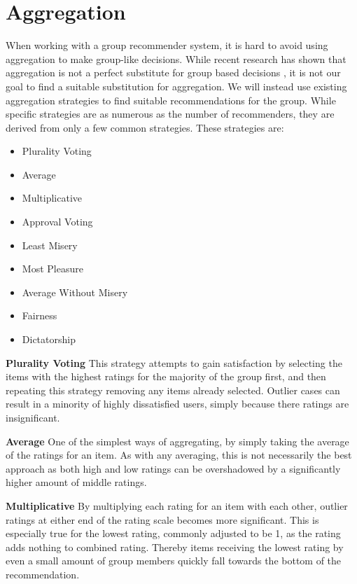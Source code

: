 \section{Aggregation} \label{bg:aggregation}
When working with a group recommender system, it is hard to avoid using aggregation to make group-like decisions. While recent research has shown that aggregation is not a perfect substitute for group based decisions , it is not our goal to find a suitable substitution for aggregation. We will instead use existing aggregation strategies to find suitable recommendations for the group. While specific strategies are as numerous as the number of recommenders, they are derived from only a few common strategies. These strategies are:

\begin{itemize}
	\item Plurality Voting
	\item Average
	\item Multiplicative
	\item Approval Voting
	\item Least Misery
	\item Most Pleasure
	\item Average Without Misery
	\item Fairness
	\item Dictatorship
\end{itemize}

\textbf{Plurality Voting}
This strategy attempts to gain satisfaction by selecting the items with the highest ratings for the majority of the group first, and then repeating this strategy removing any items already selected. Outlier cases can result in a minority of highly dissatisfied users, simply because there ratings are insignificant.

\textbf{Average}
One of the simplest ways of aggregating, by simply taking the average of the ratings for an item. As with any averaging, this is not necessarily the best approach as both high and low ratings can be overshadowed by a significantly higher amount of middle ratings.

\textbf{Multiplicative}
By multiplying each rating for an item with each other, outlier ratings at either end of the rating scale becomes more significant. This is especially true for the lowest rating, commonly adjusted to be 1, as the rating adds nothing to combined rating. Thereby items receiving the lowest rating by even a small amount of group members quickly fall towards the bottom of the recommendation.

